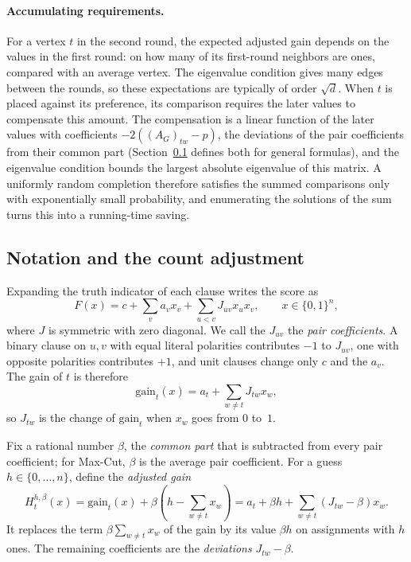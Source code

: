 \documentclass[11pt,a4paper]{article}
\theoremstyle{definition}
\theoremstyle{remark}
\newcommand{\bits}{\{0,1\}}
\begin{document}
\paragraph{Accumulating requirements.}
For a vertex $t$ in the second round, the expected adjusted gain depends on
the values in the first round: on how many of its first-round neighbors
are ones, compared with an average vertex. The eigenvalue condition gives
many edges between the rounds, so these expectations are typically of
order $\sqrt d$. When $t$ is placed against its preference, its comparison
requires the later values to compensate this amount. The compensation is a
linear function of the later values with coefficients
$-2((A_G)_{tw}-p)$, the deviations of the pair coefficients from their
common part (Section~\ref{sec:countalgorithm} defines both for general
formulas), and the eigenvalue condition bounds the largest absolute
eigenvalue of this matrix. A uniformly random completion therefore
satisfies the summed comparisons only with exponentially small
probability, and enumerating the solutions of the sum turns this into a
running-time saving.

\subsection{Notation and the count adjustment}\label{sec:countalgorithm}

Expanding the truth indicator of each clause writes the score as
\begin{equation}
 F(x)=c+\sum_v a_vx_v+\sum_{u<v}J_{uv}x_ux_v,
 \qquad x\in\bits^n,
 \label{eq:quadratic}
\end{equation}
where $J$ is symmetric with zero diagonal. We call the $J_{uv}$ the
\emph{pair coefficients}. A binary clause on $u,v$ with equal literal
polarities contributes $-1$ to $J_{uv}$, one with opposite polarities
contributes $+1$, and unit clauses change only $c$ and the $a_v$. The gain
of $t$ is therefore
\[
 \mathrm{gain}_t(x)=a_t+\sum_{w\ne t}J_{tw}x_w,
\]
so $J_{tw}$ is the change of $\mathrm{gain}_t$ when $x_w$ goes from $0$
to~$1$.

Fix a rational number $\beta$, the \emph{common part} that is subtracted
from every pair coefficient; for Max-Cut, $\beta$ is the average pair
coefficient. For a guess $h\in\{0,\ldots,n\}$, define the \emph{adjusted
gain}
\begin{equation}
 H_t^{h,\beta}(x)=\mathrm{gain}_t(x)
          +\beta\left(h-\sum_{w\ne t}x_w\right)
       =a_t+\beta h+\sum_{w\ne t}(J_{tw}-\beta)x_w.
 \label{eq:countgain}
\end{equation}
It replaces the term $\beta\sum_{w\ne t}x_w$ of the gain by its value
$\beta h$ on assignments with $h$ ones. The remaining coefficients are the
\emph{deviations} $J_{tw}-\beta$.
\end{document}
